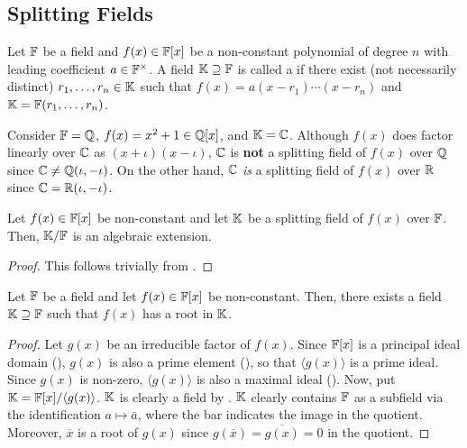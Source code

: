 \subsection{Splitting Fields}

\begin{defn}
    Let $\mathbb{F}$ be a field and $f(x) \in \mathbb{F}[x]$ be a non-constant polynomial of degree $n$ with leading coefficient $a \in \mathbb{F}^{\times}$. A field $\mathbb{K} \supseteq \mathbb{F}$ is called a  if there exist (not necessarily distinct) $r_1, \ldots, r_n \in \mathbb{K}$ such that $f(x) = a(x-r_1)\cdots(x-r_n)$ and $\mathbb{K} = \mathbb{F}(r_1, \ldots, r_n)$. 
\end{defn}

\begin{ex}
    Consider $\mathbb{F} = \mathbb{Q}$, $f(x) = x^2 + 1 \in \mathbb{Q}[x]$, and $\mathbb{K} = \mathbb{C}$. Although $f(x)$ does factor linearly over $\mathbb{C}$ as $(x+\iota)(x-\iota)$, $\mathbb{C}$ is \textbf{not} a splitting field of $f(x)$ over $\mathbb{Q}$ since $\mathbb{C} \neq \mathbb{Q}(\iota, -\iota)$. On the other hand, $\mathbb{C}$ \emph{is} a splitting field of $f(x)$ over $\mathbb{R}$ since $\mathbb{C} = \mathbb{R}(\iota, -\iota)$.
\end{ex}

\begin{cor}
    Let $f(x) \in \mathbb{F}[x]$ be non-constant and let $\mathbb{K}$ be a splitting field of $f(x)$ over $\mathbb{F}$. Then, $\mathbb{K}/\mathbb{F}$ is an algebraic extension.
\end{cor}
\begin{proof}
    This follows trivially from .
\end{proof}

\begin{theorem} \label{thm:extension-field-that-contains-root}
    Let $\mathbb{F}$ be a field and let $f(x) \in \mathbb{F}[x]$ be non-constant. Then, there exists a field $\mathbb{K} \supseteq \mathbb{F}$ such that $f(x)$ has a root in $\mathbb{K}$.
\end{theorem}
\begin{proof}
    Let $g(x)$ be an irreducible factor of $f(x)$. Since $\mathbb{F}[x]$ is a principal ideal domain (), $g(x)$ is also a prime element (), so that $\langle g(x) \rangle$ is a prime ideal. Since $g(x)$ is non-zero, $\langle g(x) \rangle$ is also a maximal ideal (). Now, put $\mathbb{K} = \mathbb{F}[x]/\langle g(x) \rangle$. $\mathbb{K}$ is clearly a field by . $\mathbb{K}$ clearly contains $\mathbb{F}$ as a subfield via the identification $a \mapsto \overline{a}$, where the bar indicates the image in the quotient. Moreover, $\overline{x}$ is a root of $g(x)$ since $g(\overline{x}) = \overline{g(x)} = 0$ in the quotient.
\end{proof}

